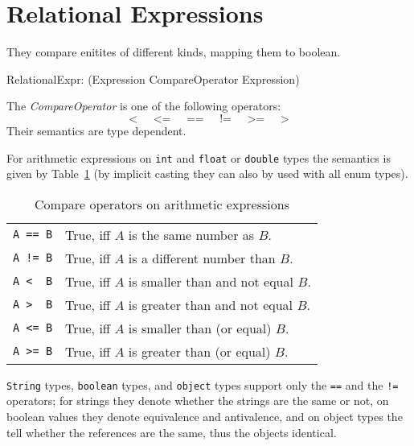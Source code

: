 \section{Relational Expressions}

They compare enitites of different kinds, mapping them to boolean.

\begin{rail}
 RelationalExpr: (Expression CompareOperator Expression)
\end{rail}

The \emph{CompareOperator} is one of the following operators:
\[ \texttt{<} \;\;\;\;\; \texttt{<=} \;\;\;\;\; \texttt{==} \;\;\;\;\; \texttt{!=} \;\;\;\;\; \texttt{>=} \;\;\;\;\; \texttt{>} \]
Their semantics are type dependent.

For arithmetic expressions on \texttt{int} and \texttt{float} or \texttt{double} types 
the semantics is given by Table~\ref{compandarithmetic} (by implicit casting they can also by used with all enum types).

\begin{table}[htbp]
  \centering
  \begin{tabularx}{\linewidth}{|l|X|} \hline
    \texttt{A == B} & True, iff $A$ is the same number as $B$. \\
    \texttt{A != B} & True, iff $A$ is a different number than $B$. \\
    \texttt{A <\ \ B} & True, iff $A$ is smaller than and not equal $B$. \\
    \texttt{A >\ \ B} & True, iff $A$ is greater than and not equal $B$. \\
    \texttt{A <= B} & True, iff $A$ is smaller than (or equal) $B$. \\
    \texttt{A >= B} & True, iff $A$ is greater than (or equal) $B$. \\ \hline
  \end{tabularx}
  \caption{Compare operators on arithmetic expressions}
  \label{compandarithmetic}
\end{table}

\texttt{String} types, \texttt{boolean} types, and \texttt{object} types support only the \texttt{==} and the \texttt{!=} operators;
for strings they denote whether the strings are the same or not, 
on boolean values they denote equivalence and antivalence, 
and on object types the tell whether the references are the same, thus the objects identical.

